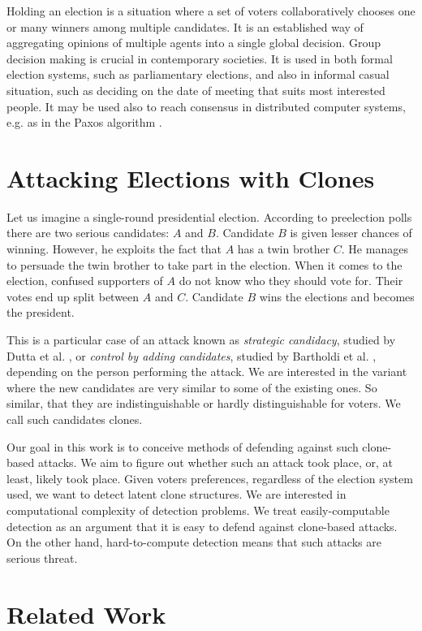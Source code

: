 Holding an election is a situation where a set of voters collaboratively chooses
one or many winners among multiple candidates.
It is an established way of aggregating opinions of multiple agents into a single global decision.
Group decision making is crucial in contemporary societies.
It is used in both formal election systems, such as parliamentary elections,
and also in informal casual situation, such as deciding on the date of meeting that suits most interested people.
It may be used also to reach consensus in distributed computer systems, e.g. as in the Paxos algorithm \cite{paxos}.

\section{Attacking Elections with Clones}

Let us imagine a single-round presidential election.
According to preelection polls there are two serious candidates: $A$ and $B$.
Candidate $B$ is given lesser chances of winning.
However, he exploits the fact that $A$ has a twin brother $C$.
He manages to persuade the twin brother to take part in the election.
When it comes to the election, confused supporters of $A$ do not know who they should vote for.
Their votes end up split between $A$ and $C$.
Candidate $B$ wins the elections and becomes the president.

This is a particular case of an attack known as \textit{strategic candidacy},
studied by Dutta et al. \cite{strategiccandidacy},
or \textit{control by adding candidates}, studied by Bartholdi et al. \cite{controlbyadding},
depending on the person performing the attack.
We are interested in the variant where the new candidates are very similar to some of the existing ones.
So similar, that they are indistinguishable or hardly distinguishable for voters.
We call such candidates clones.

Our goal in this work is to conceive methods of defending against such clone-based attacks.
We aim to figure out whether such an attack took place, or, at least, likely took place.
Given voters preferences, regardless of the election system used, we want to detect latent clone structures.
We are interested in computational complexity of detection problems.
We treat easily-computable detection as an argument that it is easy to defend against clone-based attacks.
On the other hand, hard-to-compute detection means that such attacks are serious threat.

\section{Related Work}

